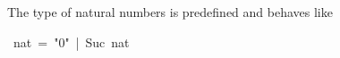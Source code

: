 \begin{isabelle}%
%
\begin{isamarkuptext}%
\noindent
The type  of natural numbers is predefined and
behaves like%
\end{isamarkuptext}%
~nat~=~{"}0{"}~|~Suc~nat\end{isabelle}%
